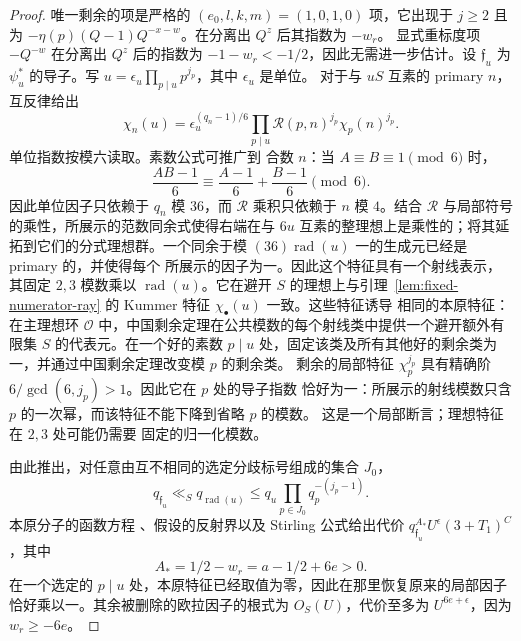 \documentclass[11pt,a4paper]{article}
\numberwithin{equation}{section}
\numberwithin{figure}{section}
\theoremstyle{definition}
\theoremstyle{remark}
\begin{document}
\begin{proof}
唯一剩余的项是严格的
$(e_0,l,k,m)=(1,0,1,0)$ 项，它出现于 $j\ge2$ 且为
$-\eta(p)(Q-1)Q^{-x-w}$。在分离出 $Q^z$ 后其指数为 $-w_r$。
显式重标度项 $-Q^{-w}$ 在分离出 $Q^z$ 后的指数为
$-1-w_r<-1/2$，因此无需进一步估计。设 $\mathfrak f_u$ 为 $\psi_u^*$ 的导子。写
$u=\epsilon_u\prod_{p\mid u}p^{j_p}$，其中 $\epsilon_u$ 是单位。
对于与 $uS$ 互素的 primary $n$，互反律给出
\[
 \chi_n(u)=\epsilon_u^{(q_n-1)/6}
       \prod_{p\mid u}\mathcal R(p,n)^{j_p}\chi_p(n)^{j_p}.
\]
单位指数按模六读取。素数公式可推广到
合数 $n$：当 $A\equiv B\equiv1\pmod6$ 时，
\[
 \frac{AB-1}{6}\equiv\frac{A-1}{6}+\frac{B-1}{6}\pmod6.
\]
因此单位因子只依赖于 $q_n$ 模 $36$，而
$\mathcal R$ 乘积只依赖于 $n$ 模 $4$。结合
$\mathcal R$ 与局部符号的乘性，所展示的范数同余式使得右端在与 $6u$ 互素的整理想上是乘性的；将其延拓到它们的分式理想群。一个同余于模
$(36)\operatorname{rad}(u)$ 一的生成元已经是 primary 的，并使得每个
所展示的因子为一。因此这个特征具有一个射线表示，其固定 $2,3$ 模数乘以
$\operatorname{rad}(u)$。它在避开 $S$ 的理想上与引理~\ref{lem:fixed-numerator-ray} 的 Kummer 特征
$\chi_\bullet(u)$ 一致。这些特征诱导
相同的本原特征：在主理想环
$\mathcal O$ 中，中国剩余定理在公共模数的每个射线类中提供一个避开额外有限集 $S$ 的代表元。在一个好的素数
$p\mid u$ 处，固定该类及所有其他好的剩余类为一，并通过中国剩余定理改变模 $p$ 的剩余类。
剩余的局部特征 $\chi_p^{j_p}$ 具有精确阶
$6/\gcd(6,j_p)>1$。因此它在 $p$ 处的导子指数
恰好为一：所展示的射线模数只含 $p$ 的一次幂，而该特征不能下降到省略 $p$ 的模数。
这是一个局部断言；理想特征在 $2,3$ 处可能仍需要
固定的归一化模数。

由此推出，对任意由互不相同的选定分歧标号组成的集合 $J_0$，
\begin{equation}\label{old-eq:5.13d}
 q_{\mathfrak f_u}\ll_S q_{\operatorname{rad}(u)}
       \le q_u\prod_{p\in J_0}q_p^{-(j_p-1)}.
\end{equation}
本原分子的函数方程
\cite[Equation (1.1)]{GZ}、假设的反射界以及 Stirling 公式给出代价
$q_{\mathfrak f_u}^{A_*}U^\epsilon(3+T_1)^C$，其中
\[
 A_*=1/2-w_r=a-1/2+6e>0.
\]
在一个选定的 $p\mid u$ 处，本原特征已经取值为零，因此在那里恢复原来的局部因子恰好乘以一。其余被删除的欧拉因子的根式为
$O_S(U)$，代价至多为 $U^{6e+\epsilon}$，因为 $w_r\ge-6e$。


\end{proof}
\end{document}
